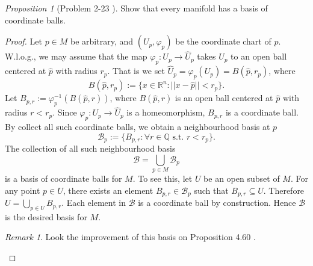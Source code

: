 \documentclass[a4paper]{article}
\theoremstyle{remark}
\newtheorem*{remark}{Remark}
\newtheorem{prop}{Proposition}
\newcommand{\rn}{\mathbb{R}^n} %
\newcommand{\rational}{\mathbb{Q}} %
\newcommand{\subhim}{\subseteq} %
\begin{document}
\begin{prop}[Problem 2-23 \cite{LeeTM}]
	Show that every manifold has a basis of coordinate balls.
\end{prop}
\begin{proof}
	Let $p\in M$ be arbitrary, and $(U_p,\varphi_p)$ be the coordinate chart of $p$. W.l.o.g., we may assume that the map $\varphi_p : U_p \to \hat{U}_p$ takes $U_p$ to an open ball centered at $\hat{p}$ with radius $r_p$. That is we set $\hat{U}_p = \varphi_p(U_p) = B(\hat{p},r_p)$, where
	$$
	B(\hat{p},r_p) := \{ x \in \rn : ||x-\hat{p}|| < r_p \}.
	$$ 
	Let $B_{p,r} := \varphi_p^{-1} (B(\hat{p},r))$, where $B(\hat{p},r)$ is an open ball centered at $\hat{p}$ with radius $r<r_p$. Since $\varphi_p : U_p \to \hat{U}_p$ is a homeomorphism, $B_{p,r}$ is a coordinate ball. By collect all such coordinate balls, we obtain a neighbourhood basis at $p$
	$$
	\mathcal{B}_p := \{ B_{p,r} : \forall r\in \rational  \text{ s.t. } r<r_p\}.
	$$
	The collection of all such neighbourhood basis 
	$$\mathcal{B} = \bigcup_{p \in M} \mathcal{B}_p $$ is a basis of coordinate balls for $M$. To see this, let $U$ be an open subset of $M$. For any point  $p \in U$, there exists an element $B_{p,r} \in \mathcal{B}_p$ such that $B_{p,r}\subhim U$. Therefore $U = \bigcup_{p \in U}B_{p,r}$. Each element in $\mathcal{B}$ is a coordinate ball by construction. Hence $\mathcal{B}$ is the desired basis for $M$.
	\begin{remark}
		Look the improvement of this basis on Proposition 4.60 \cite{LeeTM}.
	\end{remark}
	
\end{proof}
\end{document}
